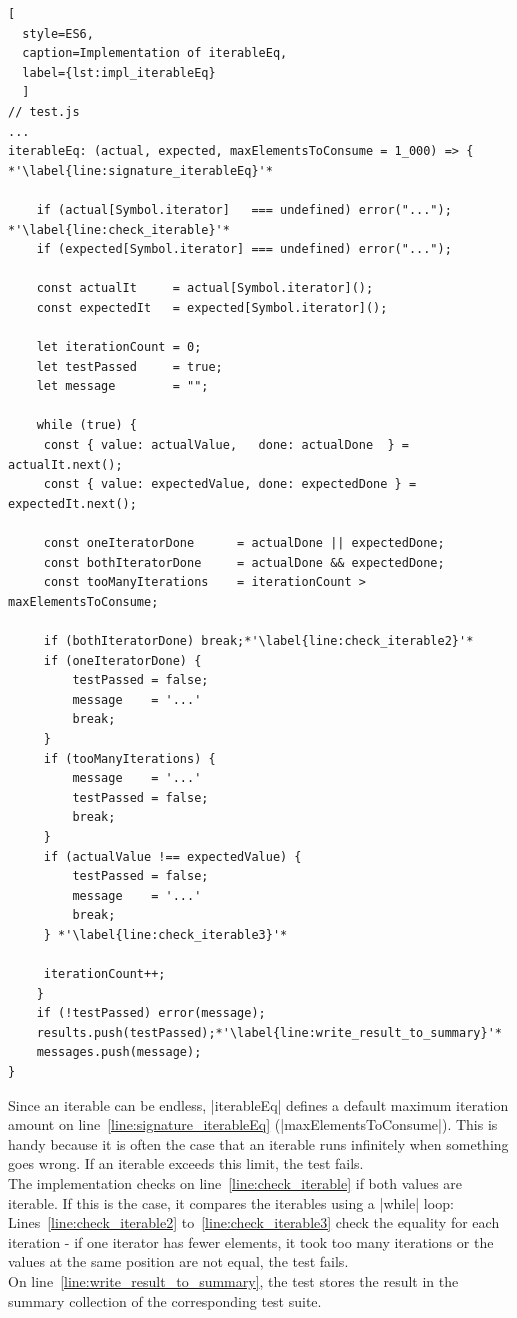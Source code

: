 \begin{lstlisting}[
  style=ES6, 
  caption=Implementation of iterableEq,
  label={lst:impl_iterableEq}
  ]
// test.js
...
iterableEq: (actual, expected, maxElementsToConsume = 1_000) => { *'\label{line:signature_iterableEq}'*

    if (actual[Symbol.iterator]   === undefined) error("..."); *'\label{line:check_iterable}'*
    if (expected[Symbol.iterator] === undefined) error("...");

    const actualIt     = actual[Symbol.iterator]();
    const expectedIt   = expected[Symbol.iterator]();

    let iterationCount = 0;
    let testPassed     = true;
    let message        = "";

    while (true) {
     const { value: actualValue,   done: actualDone  } = actualIt.next();
     const { value: expectedValue, done: expectedDone } = expectedIt.next();

     const oneIteratorDone      = actualDone || expectedDone;
     const bothIteratorDone     = actualDone && expectedDone;
     const tooManyIterations    = iterationCount > maxElementsToConsume;

     if (bothIteratorDone) break;*'\label{line:check_iterable2}'*
     if (oneIteratorDone) {
         testPassed = false;
         message    = '...'
         break;
     }
     if (tooManyIterations) {
         message    = '...'
         testPassed = false;
         break;
     }
     if (actualValue !== expectedValue) {
         testPassed = false;
         message    = '...'
         break;
     } *'\label{line:check_iterable3}'*

     iterationCount++;
    }
    if (!testPassed) error(message);
    results.push(testPassed);*'\label{line:write_result_to_summary}'*
    messages.push(message);
}
\end{lstlisting}
Since an iterable can be endless, |iterableEq| defines a default maximum
iteration amount on line~\ref{line:signature_iterableEq}
(|maxElementsToConsume|).  This is handy because it is often the case that an
iterable runs infinitely when something goes wrong. If an iterable exceeds this
limit, the test fails.\\
The implementation checks on line~\ref{line:check_iterable} if both values are
iterable. If this is the case, it compares the iterables using a |while| loop:
Lines~\ref{line:check_iterable2} to~\ref{line:check_iterable3} check the
equality for each iteration - if one iterator has fewer elements, it took
too many iterations or the values at the same position are not equal, the test
fails. \\ 
On line~\ref{line:write_result_to_summary}, the
test stores the result in the summary collection of the corresponding test
suite.
\newline

